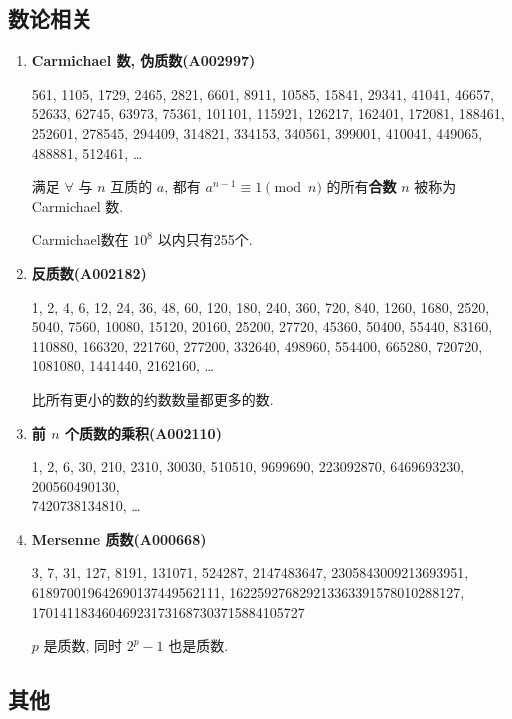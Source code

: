 \subsection{数论相关}

\begin{enumerate}
    \item \textbf{Carmichael 数, 伪质数(A002997)}
          
          561, 1105, 1729, 2465, 2821, 6601, 8911, 10585, 15841, 29341, 41041, 46657, 52633, 62745, 63973, 75361, 101101, 115921, 126217, 162401, 172081, 188461, 252601, 278545, 294409, 314821, 334153, 340561, 399001, 410041, 449065, 488881, 512461, \dots
          
          满足 \(\forall\) 与 \(n\) 互质的 \(a\), 都有 \(a ^ {n - 1} \equiv 1 \pmod n\) 的所有\textbf{合数} \(n\) 被称为 Carmichael 数.
          
          Carmichael数在 \(10^8\) 以内只有255个.
          
    \item \textbf{反质数(A002182)}
          
          1, 2, 4, 6, 12, 24, 36, 48, 60, 120, 180, 240, 360, 720, 840, 1260, 1680, 2520, 5040, 7560, 10080, 15120, 20160, 25200, 27720, 45360, 50400, 55440, 83160, 110880, 166320, 221760, 277200, 332640, 498960, 554400, 665280, 720720, 1081080, 1441440, 2162160, \dots
          
          比所有更小的数的约数数量都更多的数.
          
    \item \textbf{前 \(n\) 个质数的乘积(A002110)}
          
          1, 2, 6, 30, 210, 2310, 30030, 510510, 9699690, 223092870, 6469693230, 200560490130,\\7420738134810, \dots
          
    \item \textbf{Mersenne 质数(A000668)}
          
          3, 7, 31, 127, 8191, 131071, 524287, 2147483647, 2305843009213693951,\\618970019642690137449562111, 162259276829213363391578010288127,\\170141183460469231731687303715884105727
          
          \(p\) 是质数, 同时 \(2^p - 1\) 也是质数.
\end{enumerate}

\subsection{其他}

